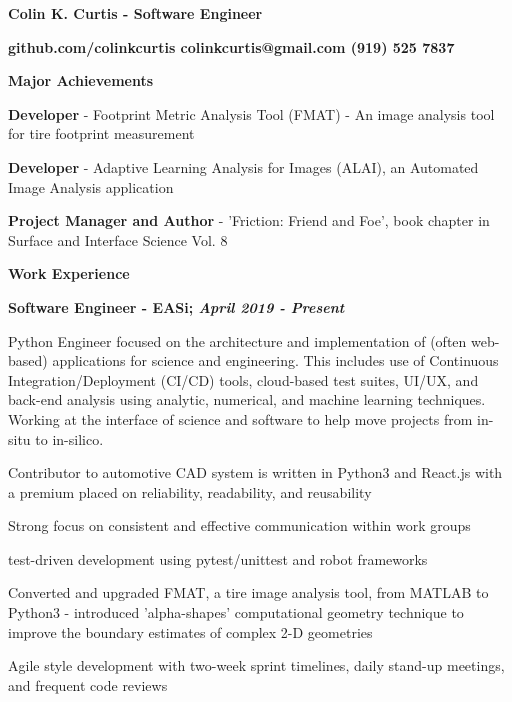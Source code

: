 \documentclass[letterpaper,final]{memoir}
\newcommand{\LargeSep}{\vspace{1.3em}}
\newcommand{\Sep}{\vspace{1.0em}}
\newcommand{\SmallSep}{\vspace{0.4em}}
\newcommand{\CVSection}[1]
	{\LARGE\textbf{#1}\par
	\SmallSep\normalsize}
\newcommand{\CVItem}[1]
	{\textbf{\color{Blue} #1}}
\newcommand\tab[1][1cm]{\hspace*{#1}}
\begin{document}
\Huge \bfseries {\color{Blue} Colin K. Curtis - Software Engineer}

\Sep
\normalsize\normalfont

\CVItem  \tab \bfseries {github.com/colinkcurtis \tab colinkcurtis@gmail.com  \tab  (919) 525 7837}

\LargeSep


\notoserif \CVSection{Major Achievements}
\normalfont

\Sep

\begin{compactitem}

    \item \textbf{Developer} - Footprint Metric Analysis Tool (FMAT) - An image analysis tool for tire footprint measurement
    \SmallSep

    \item \textbf{Developer} - Adaptive Learning Analysis for Images (ALAI), an Automated Image Analysis application
    \SmallSep

    \item \textbf{Project Manager and Author} - 'Friction: Friend and Foe', book chapter in Surface and Interface Science Vol. 8


\end{compactitem}
\LargeSep


\notoserif \CVSection{Work Experience}
\normalfont
\Sep
\CVItem{Software Engineer - EASi; \textit{April 2019 - Present}}
\begin{compactitem}[\color{Blue}$\circ$]
    \SmallSep
    \item Python Engineer focused on the architecture and implementation of (often web-based) applications for science and engineering.
    This includes use of Continuous Integration/Deployment (CI/CD) tools, cloud-based test suites, UI/UX, and back-end analysis
    using analytic, numerical, and machine learning techniques. Working at the interface of science and software to help move
    projects from in-situ to in-silico.
    \SmallSep
    \item  Contributor to automotive CAD system is written in Python3 and React.js with a premium placed on reliability, readability, and reusability
    \SmallSep
    \item Strong focus on consistent and effective communication within work groups
    \SmallSep
    \item test-driven development using pytest/unittest and robot frameworks
    \SmallSep
    \item Converted and upgraded FMAT, a tire image analysis tool, from MATLAB to Python3 - introduced
    \newline
    'alpha-shapes' computational geometry technique to improve the boundary estimates of complex 2-D geometries
    \SmallSep
    \item Agile style development with two-week sprint timelines, daily stand-up meetings, and frequent code reviews
    \SmallSep
\end{compactitem}
\end{document}
